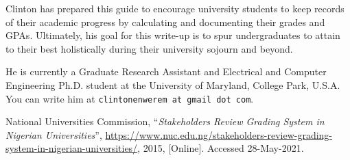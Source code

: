 \documentclass[letter]{article}
\begin{document}

Clinton has prepared this guide to encourage university students to keep records of their academic progress by calculating and documenting their grades and GPAs. Ultimately, his goal for this write-up is to spur undergraduates to attain to their best holistically during their university sojourn and beyond. 

He is currently a Graduate Research Assistant and Electrical and Computer Engineering Ph.D. student at the University of Maryland, College Park, U.S.A. You can write him at \texttt{clintonenwerem at gmail dot com}.

\renewcommand\refname{\sffamily Reference}
\lhead{}
\rhead{}
\begin{thebibliography}{}
	National Universities Commission,
	``\textit{Stakeholders Review Grading System in Nigerian Universities}'',
	\url{https://www.nuc.edu.ng/stakeholders-review-grading-system-in-nigerian-universities/},
	2015,
	[Online]. Accessed 28-May-2021.
\end{thebibliography}
\end{document}
